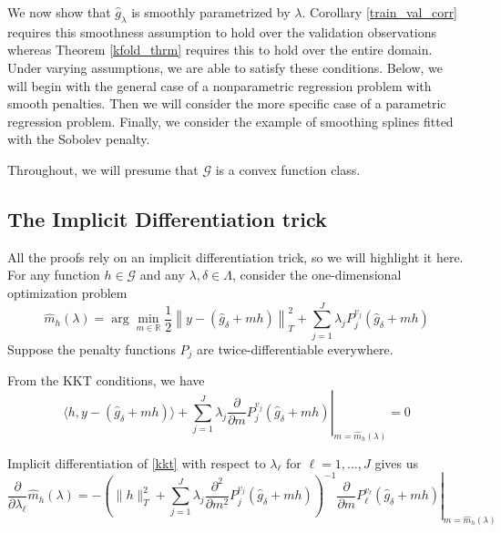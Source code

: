 \documentclass[12pt]{article}
\begin{document}
We now show that $\hat{g}_\lambda$ is smoothly parametrized by $\lambda$. Corollary \ref{train_val_corr} requires this smoothness assumption to hold over the validation observations whereas Theorem \ref{kfold_thrm} requires this to hold over the entire domain. Under varying assumptions, we are able to satisfy these conditions. Below, we will begin with the general case of a nonparametric regression problem with smooth penalties. Then we will consider the more specific case of a parametric regression problem. Finally, we consider the example of smoothing splines fitted with the Sobolev penalty. 

Throughout, we will presume that $\mathcal{G}$ is a convex function class. 

\subsection{The Implicit Differentiation trick}
\label{sec:imp_diff}

All the proofs rely on an implicit differentiation trick, so we will highlight it here. For any function $h \in \mathcal{G}$ and any $\lambda, \delta \in \Lambda$, consider the one-dimensional optimization problem
\begin{equation}
\label{one_dim_opt}
\hat{m}_{h}(\lambda)=\arg\min_{m \in \mathbb{R}}\frac{1}{2} \left \|y-(\hat{g}_{\delta}+mh) \right \|_{T}^{2} + \sum_{j=1}^J \lambda_j P_j^{v_j}(\hat{g}_\delta+mh)
\end{equation}
Suppose the penalty functions $P_j$ are twice-differentiable everywhere.

From the KKT conditions, we have
\begin{equation}
\label{kkt}
\left . \langle h, y - (\hat{g}_{\delta}+mh) \rangle + \sum_{j=1}^J \lambda_j \frac{\partial}{\partial m } P_j^{v_j}(\hat{g}_\delta+mh)  \right |_{m = \hat{m}_{h}(\lambda)}= 0
\end{equation}

Implicit differentiation of \eqref{kkt} with respect to $\lambda_\ell$ for $\ell = 1, ..., J$ gives us
\begin{equation}
\label{imp_derivative}
\frac{\partial}{\partial\lambda_{\ell}}\hat{m}_{h}(\lambda) =
- \left.
\left( \|h\|_{T}^{2} + \sum_{j=1}^J \lambda_j \frac{\partial^{2}}{\partial m^{2}}P_j^{v_j} (\hat{g}_{\delta}+mh ) \right)^{-1}
\frac{\partial}{\partial m}P_{\ell}^{v_{\ell}}(\hat{g}_\delta+mh)
\right |_{m=\hat{m}_{h}(\lambda)}
\end{equation}
\end{document}
